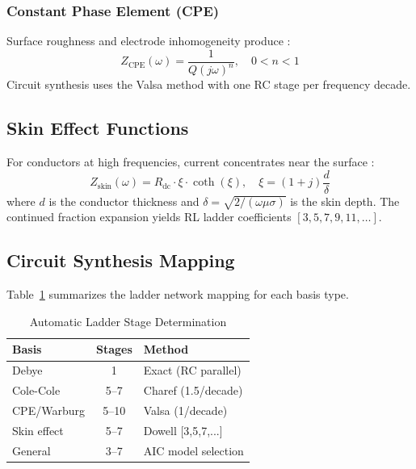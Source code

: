 \documentclass{ieeeaccess}
\begin{document}
\subsubsection{Constant Phase Element (CPE)}
Surface roughness and electrode inhomogeneity produce \cite{jorcin2006cpe}:
\begin{equation}
Z_{\text{CPE}}(\omega) = \frac{1}{Q(j\omega)^n}, \quad 0 < n < 1
\end{equation}
Circuit synthesis uses the Valsa method \cite{valsa2013rc} with one RC stage per frequency decade.

\subsection{Skin Effect Functions}

For conductors at high frequencies, current concentrates near the surface \cite{dowell1966eddy}:
\begin{equation}
Z_{\text{skin}}(\omega) = R_{\text{dc}} \cdot \xi \cdot \coth(\xi), \quad \xi = (1+j)\frac{d}{\delta}
\end{equation}
where $d$ is the conductor thickness and $\delta = \sqrt{2/(\omega\mu\sigma)}$ is the skin depth. The continued fraction expansion yields RL ladder coefficients $[3, 5, 7, 9, 11, \ldots]$.

\subsection{Circuit Synthesis Mapping}

Table~\ref{tab:synthesis} summarizes the ladder network mapping for each basis type.

\begin{table}[!t]
\caption{Automatic Ladder Stage Determination}
\label{tab:synthesis}
\centering
\begin{tabular}{@{}lcl@{}}
\toprule
\textbf{Basis} & \textbf{Stages} & \textbf{Method} \\
\midrule
Debye & 1 & Exact (RC parallel) \\
Cole-Cole & 5--7 & Charef (1.5/decade) \\
CPE/Warburg & 5--10 & Valsa (1/decade) \\
Skin effect & 5--7 & Dowell [3,5,7,...] \\
General & 3--7 & AIC model selection \\
\bottomrule
\end{tabular}
\end{table}
\end{document}
